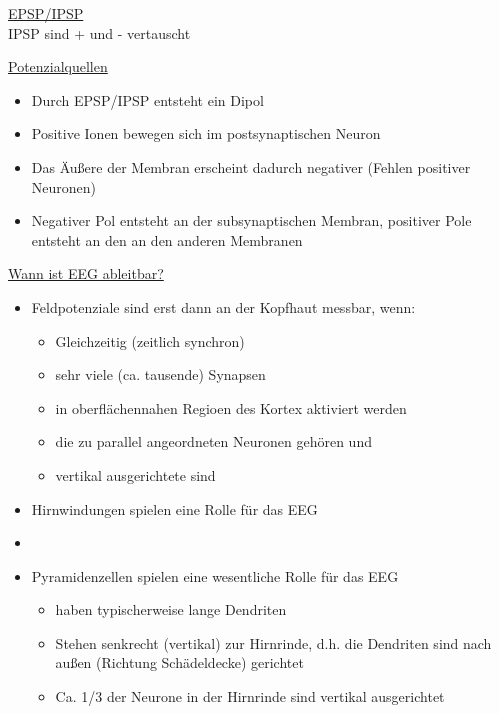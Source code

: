 \documentclass[a4paper,10pt,oneside]{article}
\begin{document}
\underline{EPSP/IPSP} \\

IPSP sind + und - vertauscht 


\underline{Potenzialquellen} \\
	\begin{itemize}
		\item Durch EPSP/IPSP entsteht ein Dipol
		\item Positive Ionen bewegen sich im postsynaptischen Neuron
		\item Das Äußere der Membran erscheint dadurch negativer (Fehlen positiver Neuronen)
		\item Negativer Pol entsteht an der subsynaptischen Membran, positiver Pole entsteht an den an den anderen Membranen
	\end{itemize}
 		
\underline{Wann ist EEG ableitbar?} \\
	\begin{itemize}
		\item Feldpotenziale sind erst dann an der Kopfhaut messbar, wenn:	
			\begin{itemize}
				\item Gleichzeitig (zeitlich synchron)
				\item sehr viele (ca. tausende) Synapsen
				\item in oberflächennahen Regioen des Kortex aktiviert werden
				\item die zu parallel angeordneten Neuronen gehören und 
				\item vertikal ausgerichtete sind
			\end{itemize}
		\item Hirnwindungen spielen eine Rolle für das EEG
		\item[] %
		\item Pyramidenzellen spielen eine wesentliche Rolle für das EEG
			\begin{itemize}
				\item haben typischerweise lange Dendriten
				\item Stehen senkrecht (vertikal) zur Hirnrinde, d.h. die Dendriten sind nach außen (Richtung Schädeldecke) gerichtet
				\item Ca. 1/3 der Neurone in der Hirnrinde sind vertikal ausgerichtet
			\end{itemize}
	\end{itemize}
\end{document}
